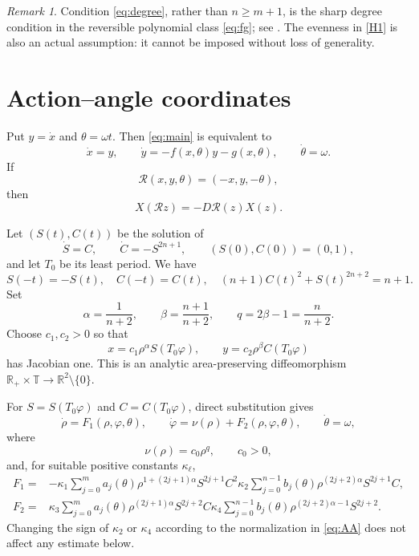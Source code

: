 \documentclass[11pt]{amsart}
\theoremstyle{remark}
\newtheorem{remark}[theorem]{Remark}
\newcommand{\T}{\mathbb T}
\newcommand{\R}{\mathbb R}
\newcommand{\cR}{\mathcal R}
\begin{document}
\begin{remark}
Condition \eqref{eq:degree}, rather than $n\geq m+1$, is the sharp degree
condition in the reversible polynomial class \eqref{eq:fg}; see
\cite{LiuZanolin}.  The evenness in \ref{H1} is also an actual assumption:
it cannot be imposed without loss of generality.
\end{remark}

\section{Action--angle coordinates}

Put $y=\dot x$ and $\theta=\omega t$.  Then \eqref{eq:main} is equivalent to
\begin{equation}\label{eq:extended}
 \dot x=y,\qquad
 \dot y=-f(x,\theta)y-g(x,\theta),\qquad
 \dot\theta=\omega.
\end{equation}
If
\[
 \cR(x,y,\theta)=(-x,y,-\theta),
\]
then
\begin{equation}\label{eq:rev}
 X(\cR z)=-D\cR(z)X(z).
\end{equation}

Let $(S(t),C(t))$ be the solution of
\begin{equation}\label{eq:SC}
 \dot S=C,\qquad \dot C=-S^{2n+1},\qquad (S(0),C(0))=(0,1),
\end{equation}
and let $T_0$ be its least period.  We have
\begin{equation}\label{eq:SCproperties}
 S(-t)=-S(t),\quad C(-t)=C(t),\quad
 (n+1)C(t)^2+S(t)^{2n+2}=n+1.
\end{equation}
Set
\begin{equation}\label{eq:ab}
 \alpha=\frac1{n+2},\qquad
 \beta=\frac{n+1}{n+2},\qquad q=2\beta-1=\frac n{n+2}.
\end{equation}
Choose $c_1,c_2>0$ so that
\begin{equation}\label{eq:AA}
 x=c_1\rho^\alpha S(T_0\varphi),\qquad
 y=c_2\rho^\beta C(T_0\varphi)
\end{equation}
has Jacobian one.  This is an analytic area-preserving diffeomorphism
$\R_+\times\T\to\R^2\setminus\{0\}$.

For $S=S(T_0\varphi)$ and $C=C(T_0\varphi)$, direct substitution gives
\begin{equation}\label{eq:AAfield}
 \dot\rho=F_1(\rho,\varphi,\theta),\qquad
 \dot\varphi=\nu(\rho)+F_2(\rho,\varphi,\theta),\qquad
 \dot\theta=\omega,
\end{equation}
where
\begin{equation}\label{eq:nu}
 \nu(\rho)=c_0\rho^q,\qquad c_0>0,
\end{equation}
and, for suitable positive constants $\kappa_\ell$,
\begin{align}
F_1={}&-\kappa_1\sum_{j=0}^{m}
 a_j(\theta)\rho^{1+(2j+1)\alpha}S^{2j+1}C^2
 \kappa_2\sum_{j=0}^{n-1}
 b_j(\theta)\rho^{(2j+2)\alpha}S^{2j+1}C,
 \label{eq:F1}\\
F_2={}&\kappa_3\sum_{j=0}^{m}
 a_j(\theta)\rho^{(2j+1)\alpha}S^{2j+2}C
 \kappa_4\sum_{j=0}^{n-1}
 b_j(\theta)\rho^{(2j+2)\alpha-1}S^{2j+2}.
 \label{eq:F2}
\end{align}
Changing the sign of $\kappa_2$ or $\kappa_4$ according to the normalization
in \eqref{eq:AA} does not affect any estimate below.
\end{document}
